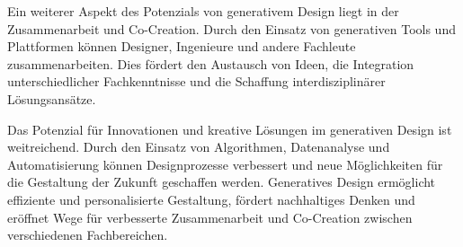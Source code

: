 Ein weiterer Aspekt des Potenzials von generativem Design liegt in der Zusammenarbeit und Co-Creation. Durch den Einsatz von generativen Tools und Plattformen können Designer, Ingenieure und andere Fachleute zusammenarbeiten. Dies fördert den Austausch von Ideen, die Integration unterschiedlicher Fachkenntnisse und die Schaffung interdisziplinärer Lösungsansätze.

Das Potenzial für Innovationen und kreative Lösungen im generativen Design ist weitreichend. Durch den Einsatz von Algorithmen, Datenanalyse und Automatisierung können Designprozesse verbessert und neue Möglichkeiten für die Gestaltung der Zukunft geschaffen werden. Generatives Design ermöglicht effiziente und personalisierte Gestaltung, fördert nachhaltiges Denken und eröffnet Wege für verbesserte Zusammenarbeit und Co-Creation zwischen verschiedenen Fachbereichen.
